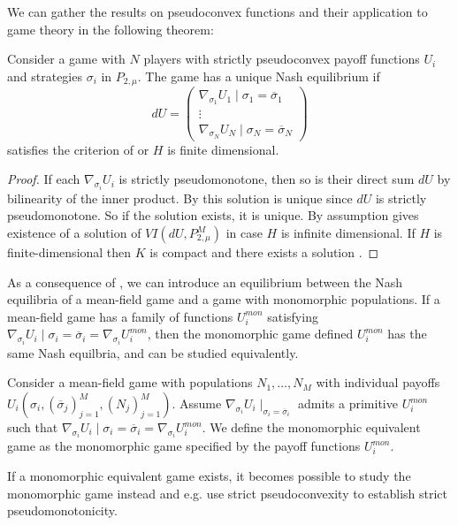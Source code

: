 We can gather the results on pseudoconvex functions and their application to game theory in the following theorem:
\begin{theorem} \label{thm:nash_unique}
  Consider a game with $N$ players with strictly pseudoconvex payoff functions $U_i$ and strategies $\sigma_i$ in $P_{2,\mu}$. The game has a unique Nash equilibrium if
  \begin{equation}
    dU=
    \begin{pmatrix}
      \nabla_{\sigma_1} U_1\mid{\sigma_1 = \overbar{\sigma}_1}\\
      \vdots \\
      \nabla_{\sigma_N} U_N \mid{\sigma_N = \overbar{\sigma}_N}
    \end{pmatrix}
  \end{equation}
  satisfies the criterion of  or $H$ is finite dimensional.
\end{theorem}
\begin{proof}
   If each $\nabla_{\sigma_i} U_i$ is strictly pseudomonotone, then so is their direct sum $dU$ by bilinearity of the inner product. By  this solution is unique since $dU$ is strictly pseudomonotone. So if the solution exists, it is unique. By assumption  gives existence of a solution of $VI(dU,P_{2,\mu}^M)$ in case $H$ is infinite dimensional. If $H$ is finite-dimensional then $K$ is compact and there exists a solution .
\end{proof}
As a consequence of , we can introduce an equilibrium between the Nash equilibria of a mean-field game and a game with monomorphic populations. If a mean-field game has a family of functions $U_i^{mon}$ satisfying $\nabla_{\sigma_i} U_i\mid{\sigma_i = \overbar{\sigma}_i} = \nabla_{\sigma_i} U_i^{mon}$, then the monomorphic game defined $U_i^{mon}$ has the same Nash equilbria, and can be studied equivalently.
\begin{definition}
  \label{def:correspondence}
  Consider a mean-field game with populations $N_1,\dots,N_M$ with individual payoffs $U_i(\sigma_i, (\overbar{\sigma}_j)_{j=1}^M, (N_j)_{j=1}^M)$. Assume $\nabla_{\sigma_i}U_i\mid_{\sigma_i=\overbar{\sigma}_i}$ admits a primitive $U_i^{mon}$ such that $\nabla_{\sigma_i} U_i\mid{\sigma_i = \overbar{\sigma}_i} = \nabla_{\sigma_i} U_i^{mon}$.
   We define the monomorphic equivalent game as the monomorphic game specified by the payoff functions $U_i^{mon}$.
\end{definition}
If a monomorphic equivalent game exists, it becomes possible to study the monomorphic game instead and e.g. use strict pseudoconvexity to establish strict pseudomonotonicity.


